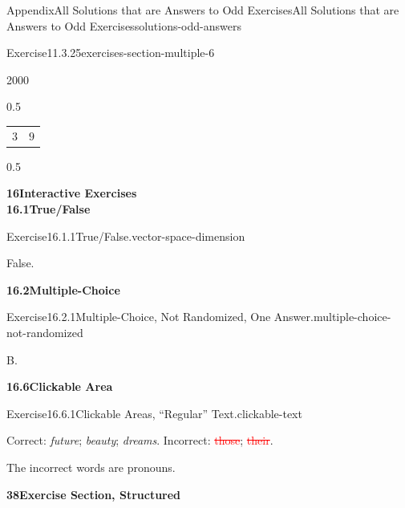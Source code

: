 \documentclass[twoside,10pt,]{article}
\newcommand{\deletethick}{.25ex}
\newcommand{\deleted}[1]{\renewcommand{\ULthickness}{\deletethick}\textcolor{red}{\sout{#1}}}
\numberwithin{equation}{section}
\begin{document}
\begin{solutions-section}{Appendix}{All Solutions that are Answers to Odd Exercises}{}{All Solutions that are Answers to Odd Exercises}{}{}{solutions-odd-answers}
\begin{divisionsolution}{Exercise}{11.3.25}{}{exercises-section-multiple-6}
\begin{sidebyside}{2}{0}{0}{0}
\begin{sbspanel}{0.5}
{{{\begin{tabular}{cc}
\(3\)&\(9\)
\end{tabular}
}%
\par}
}%
\end{sbspanel}%
\begin{sbspanel}{0.5}%
\noindent{}%
\end{sbspanel}%
\end{sidebyside}%
\end{divisionsolution}%
\par\medskip
\noindent\textbf{\large{}16\space\textperiodcentered\space{}Interactive Exercises\\
16.1\space\textperiodcentered\space{}True\slash{}False}
\begin{divisionsolution}{Exercise}{16.1.1}{True\slash{}False.}{vector-space-dimension}%
\par\smallskip%
\noindent\hypertarget{vector-space-dimension-5-back}{}False.%
\end{divisionsolution}%
\par\medskip
\noindent\textbf{\large{}16.2\space\textperiodcentered\space{}Multiple-Choice}
\begin{divisionsolution}{Exercise}{16.2.1}{Multiple-Choice, Not Randomized, One Answer.}{multiple-choice-not-randomized}%
\par\smallskip%
\noindent\hypertarget{multiple-choice-not-randomized-6-back}{}B.%
\end{divisionsolution}%
\par\medskip
\noindent\textbf{\large{}16.6\space\textperiodcentered\space{}Clickable Area}
\begin{divisionsolution}{Exercise}{16.6.1}{Clickable Areas, ``Regular'' Text.}{clickable-text}%
\par\smallskip%
\noindent\hypertarget{clickable-text-3-back}{}Correct: \emph{future}; \emph{beauty}; \emph{dreams}. Incorrect: \deleted{those}; \deleted{their}.%
\par
The incorrect words are pronouns.%
\end{divisionsolution}%
\par\medskip
\noindent\textbf{\large{}38\space\textperiodcentered\space{}Exercise Section, Structured}

\end{solutions-section}
\end{document}
